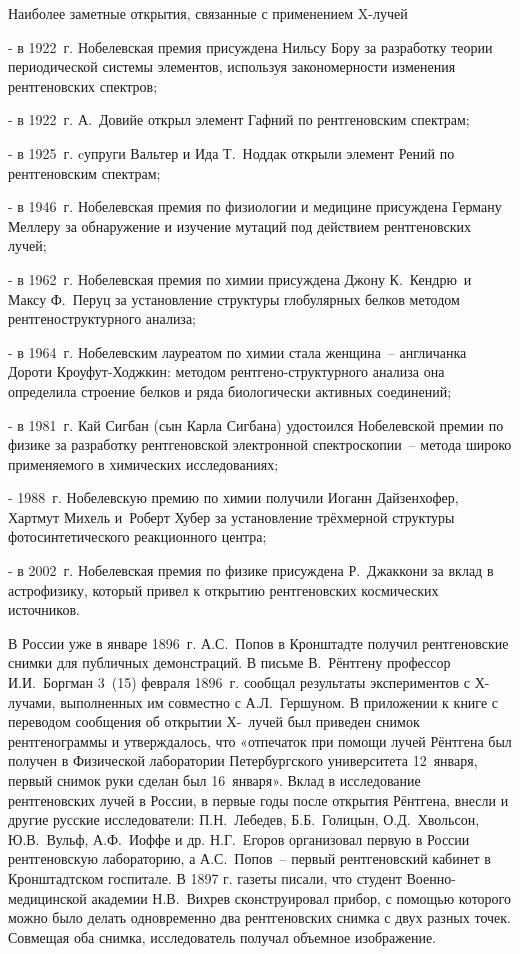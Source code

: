 \documentclass[a4paper,14pt, openany, twoside, draft]{extbook} %
\begin{document}
Наиболее заметные открытия, связанные с применением X-лучей

{}- в 1922~г. Нобелевская премия присуждена Нильсу Бору за разработку теории периодической системы элементов, используя закономерности изменения рентгеновских спектров;

{}- в 1922~г. А.~Довийе открыл элемент Гафний по рентгеновским спектрам;

{}- в 1925~г. cупруги Вальтер и Ида Т.~Ноддак открыли элемент Рений по рентгеновским спектрам;

{}- в 1946~г. Нобелевская премия по физиологии и медицине присуждена Герману Меллеру за обнаружение и изучение мутаций под действием рентгеновских лучей;

{}- в 1962~г. Нобелевская премия по химии присуждена Джону К.~Кендрю~и Максу Ф.~Перуц за установление структуры глобулярных белков методом рентгеноструктурного анализа;

{}- в 1964~г. Нобелевским лауреатом по химии стала женщина~-- англичанка Дороти Кроуфут-Ходжкин: методом рентгено-структурного анализа она определила строение белков и ряда биологически активных соединений;

{}- в 1981~г. Кай Сигбан (сын Карла Сигбана) удостоился Нобелевской премии по физике за разработку рентгеновской электронной спектроскопии~-- метода широко применяемого в химических исследованиях;

{}- 1988~г. Нобелевскую премию по химии получили Иоганн Дайзенхофер, Хартмут Михель и~Роберт Хубер за установление трёхмерной структуры фотосинтетического реакционного центра;

{}- в 2002~г. Нобелевская премия по физике присуждена Р.~Джаккони за вклад в астрофизику, который привел к открытию рентгеновских космических источников.

В России уже в январе 1896~г. А.С.~Попов в Кронштадте получил рентгеновские снимки для публичных демонстраций.  В письме В.~Рёнтгену профессор И.И.~Боргман 3~(15) февраля 1896~г. сообщал результаты экспериментов с Х-лучами, выполненных им совместно с А.Л.~Гершуном.  В приложении к книге с переводом сообщения об открытии Х-~лучей был приведен снимок рентгенограммы и утверждалось, что «отпечаток при помощи лучей Рёнтгена был получен в Физической лаборатории Петербургского университета 12~января, первый снимок руки сделан был 16~января».  Вклад в исследование рентгеновских лучей в России, в первые годы после открытия Рёнтгена, внесли и другие русские исследователи: П.Н.~Лебедев, Б.Б.~Голицын, О.Д.~Хвольсон, Ю.В.~Вульф, А.Ф.~Иоффе и др.   Н.Г.~Егоров организовал первую в России рентгеновскую лабораторию, а А.С.~Попов~-- первый рентгеновский кабинет в Кронштадтском госпитале. В 1897 г. газеты писали, что студент Военно-медицинской академии Н.В.~Вихрев сконструировал прибор, с помощью которого можно было делать одновременно два рентгеновских снимка с двух разных точек. Совмещая оба снимка, исследователь получал объемное изображение.
\end{document}
